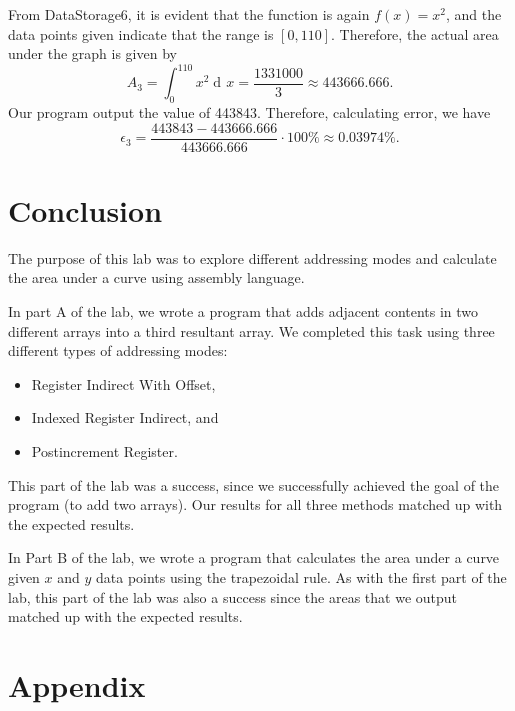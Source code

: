 \documentclass[10pt, letterpaper, titlepage]{article} %
\DeclareMathOperator{\di}{d\!} %
\begin{document}
\begin{multicols*}{2}
From DataStorage6, it is evident that the function is again $f(x) = x^2$, and the data points given indicate that the range is $[0, 110]$. Therefore, the actual area under the graph is given by
\begin{equation}
	A_3 = \int_0^{110} x^2 \di x = \dfrac{1331000}{3} \approx 443666.666.
\end{equation} 
Our program output the value of 443843. Therefore, calculating error, we have
\begin{equation}
	\epsilon_3 = \dfrac{443843 - 443666.666}{443666.666} \cdot 100\% \approx 0.03974\%. 
\end{equation}

\section{Conclusion}
The purpose of this lab was to explore different addressing modes and calculate the area under a curve using assembly language. 

In part A of the lab, we wrote a program that adds adjacent contents in two different arrays into a third resultant array. 
We completed this task using three different types of addressing modes:
\begin{itemize}
	\item Register Indirect With Offset,
	\item Indexed Register Indirect, and
	\item Postincrement Register.
\end{itemize}
This part of the lab was a success, since we successfully achieved the goal of the program (to add two arrays). 
Our results for all three methods matched up with the expected results.

In Part B of the lab, we wrote a program that calculates the area under a curve given $x$ and $y$ data points using the trapezoidal rule. As with the first part of the lab, this part of the lab was also a success since the areas that we output matched up with the expected results.


\end{multicols*}

\newpage

\section{Appendix}
\end{document}
